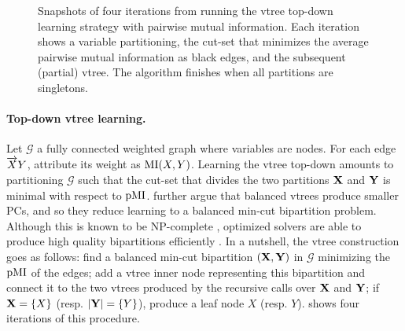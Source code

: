 \begin{figure}[t]
{
  }
  \caption{Snapshots of four iterations from running the vtree top-down learning strategy with
    pairwise mutual information. Each iteration shows a variable partitioning, the cut-set that
    minimizes the average pairwise mutual information as black edges, and the subsequent (partial)
    vtree. The algorithm finishes when all partitions are singletons.}
  \label{fig:topdownvtree}
\end{figure}

\paragraph{Top-down vtree learning.} Let $\mathcal{G}$ a fully connected weighted graph where
variables are nodes. For each edge $\overrightarrow{X}{Y}$, attribute its weight as $\operatorname{\normalfont{MI}}(X,Y)$.
Learning the vtree top-down amounts to partitioning $\mathcal{G}$ such that the cut-set that
divides the two partitions $\mathbf{X}$ and $\mathbf{Y}$ is minimal with respect to $\operatorname{\normalfont{pMI}}$.
\citet{liang17} further argue that balanced vtrees produce smaller PCs, and so they reduce learning
to a balanced min-cut bipartition problem. Although this is known to be NP-complete
\citep{garey90}, optimized solvers are able to produce high quality bipartitions efficiently
\citep{karypsis98}. In a nutshell, the vtree construction goes as follows: find a balanced min-cut
bipartition $(\mathbf{X}, \mathbf{Y})$ in $\mathcal{G}$ minimizing the $\operatorname{\normalfont{pMI}}$ of the edges; add a
vtree inner node representing this bipartition and connect it to the two vtrees produced by the
recursive calls over $\mathbf{X}$ and $\mathbf{Y}$; if $\mathbf{X}=\{X\}$ (resp. $|\mathbf{Y}|=\{Y\}$), produce
a leaf node $X$ (resp. $Y$).  shows four iterations of this procedure.

